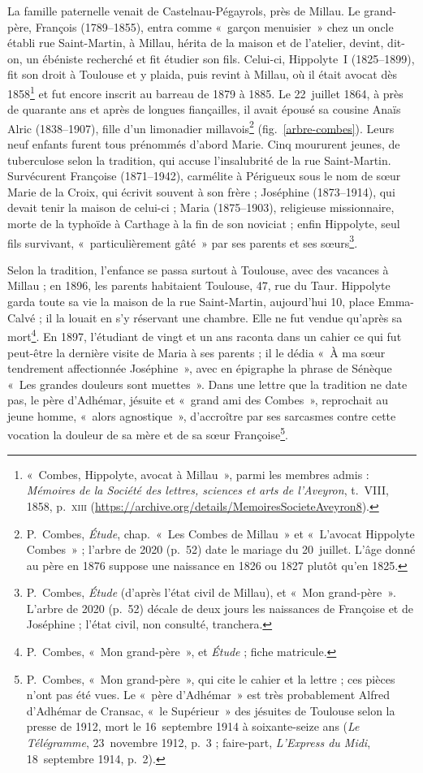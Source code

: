 La famille paternelle venait de Castelnau-Pégayrols, près de Millau. Le grand-père, François (1789--1855), entra comme «~garçon menuisier~» chez un oncle établi rue Saint-Martin, à Millau, hérita de la maison et de l'atelier, devint, dit-on, un ébéniste recherché et fit étudier son fils. Celui-ci, Hippolyte~I (1825--1899), fit son droit à Toulouse et y plaida, puis revint à Millau, où il était avocat dès 1858\footnote{«~Combes, Hippolyte, avocat à Millau~», parmi les membres admis : \textit{Mémoires de la Société des lettres, sciences et arts de l'Aveyron}, t.~VIII, 1858, p.~\textsc{xiii} (\url{https://archive.org/details/MemoiresSocieteAveyron8}).} et fut encore inscrit au barreau de 1879 à 1885. Le 22~juillet 1864, à près de quarante ans et après de longues fiançailles, il avait épousé sa cousine Anaïs Alric (1838--1907), fille d'un limonadier millavois\footnote{P.~Combes, \textit{Étude}, chap.~«~Les Combes de Millau~» et «~L'avocat Hippolyte Combes~» ; l'arbre de 2020 (p.~52) date le mariage du 20~juillet. L'âge donné au père en 1876 suppose une naissance en 1826 ou 1827 plutôt qu'en 1825.} (fig.~\ref{arbre-combes}). Leurs neuf enfants furent tous prénommés d'abord Marie. Cinq moururent jeunes, de tuberculose selon la tradition, qui accuse l'insalubrité de la rue Saint-Martin. Survécurent Françoise (1871--1942), carmélite à Périgueux sous le nom de sœur Marie de la Croix, qui écrivit souvent à son frère ; Joséphine (1873--1914), qui devait tenir la maison de celui-ci ; Maria (1875--1903), religieuse missionnaire, morte de la typhoïde à Carthage à la fin de son noviciat ; enfin Hippolyte, seul fils survivant, «~particulièrement gâté~» par ses parents et ses sœurs\footnote{P.~Combes, \textit{Étude} (d'après l'état civil de Millau), et «~Mon grand-père~». L'arbre de 2020 (p.~52) décale de deux jours les naissances de Françoise et de Joséphine ; l'état civil, non consulté, tranchera.}.

Selon la tradition, l'enfance se passa surtout à Toulouse, avec des vacances à Millau ; en 1896, les parents habitaient Toulouse, 47, rue du Taur. Hippolyte garda toute sa vie la maison de la rue Saint-Martin, aujourd'hui 10, place Emma-Calvé ; il la louait en s'y réservant une chambre. Elle ne fut vendue qu'après sa mort\footnote{P.~Combes, «~Mon grand-père~», et \textit{Étude} ; fiche matricule.}. En 1897, l'étudiant de vingt et un ans raconta dans un cahier ce qui fut peut-être la dernière visite de Maria à ses parents ; il le dédia «~À ma sœur tendrement affectionnée Joséphine~», avec en épigraphe la phrase de Sénèque «~Les grandes douleurs sont muettes~». Dans une lettre que la tradition ne date pas, le père d'Adhémar, jésuite et «~grand ami des Combes~», reprochait au jeune homme, «~alors agnostique~», d'accroître par ses sarcasmes contre cette vocation la douleur de sa mère et de sa sœur Françoise\footnote{P.~Combes, «~Mon grand-père~», qui cite le cahier et la lettre ; ces pièces n'ont pas été vues. Le «~père d'Adhémar~» est très probablement Alfred d'Adhémar de Cransac, «~le Supérieur~» des jésuites de Toulouse selon la presse de 1912, mort le 16~septembre 1914 à soixante-seize ans (\textit{Le Télégramme}, 23~novembre 1912, p.~3 ; faire-part, \textit{L'Express du Midi}, 18~septembre 1914, p.~2).}.

